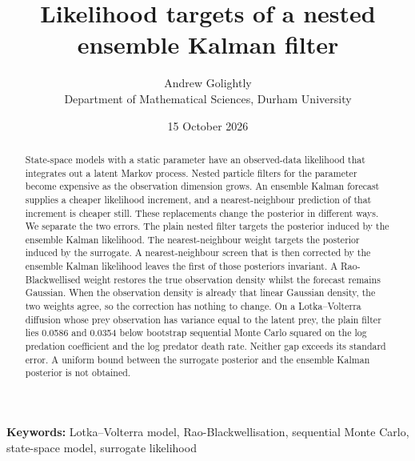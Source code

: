 \documentclass[11pt,a4paper]{article}
\title{Likelihood targets of a nested ensemble Kalman filter}
\author{Andrew Golightly\\
Department of Mathematical Sciences, Durham University}
\date{15 October 2026}
\begin{document}
\maketitle

\begin{abstract}
State-space models with a static parameter have an observed-data likelihood that integrates out a latent Markov process. Nested particle filters for the parameter become expensive as the observation dimension grows. An ensemble Kalman forecast supplies a cheaper likelihood increment, and a nearest-neighbour prediction of that increment is cheaper still. These replacements change the posterior in different ways. We separate the two errors. The plain nested filter targets the posterior induced by the ensemble Kalman likelihood. The nearest-neighbour weight targets the posterior induced by the surrogate. A nearest-neighbour screen that is then corrected by the ensemble Kalman likelihood leaves the first of those posteriors invariant. A Rao-Blackwellised weight restores the true observation density whilst the forecast remains Gaussian. When the observation density is already that linear Gaussian density, the two weights agree, so the correction has nothing to change. On a Lotka--Volterra diffusion whose prey observation has variance equal to the latent prey, the plain filter lies 0.0586 and 0.0354 below bootstrap sequential Monte Carlo squared on the log predation coefficient and the log predator death rate. Neither gap exceeds its standard error. A uniform bound between the surrogate posterior and the ensemble Kalman posterior is not obtained.
\end{abstract}

\noindent\textbf{Keywords:} Lotka--Volterra model, Rao-Blackwellisation, sequential Monte Carlo, state-space model, surrogate likelihood









\end{document}
